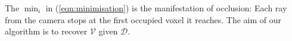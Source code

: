 \documentclass[10pt,twocolumn,letterpaper]{article}
\newcommand{\rgbdimage}{\mathcal{D}}
\newcommand{\voxelgrid}{\mathcal{V}}
\newcommand{\voxidx}{i}
\begin{document}
The $\min_\voxidx$ in (\ref{eqn:minimisation}) is the manifestation of occlusion: Each ray from the camera stops at the first occupied voxel it reaches.
The aim of our algorithm is to recover $\voxelgrid$ given $\rgbdimage$.


\end{document}
